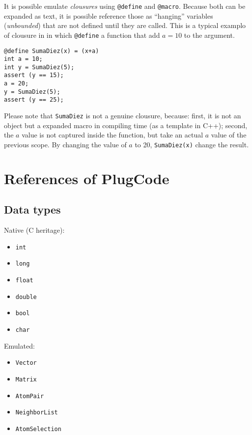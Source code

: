 \documentclass[a4paper,12pt]{article}
\begin{document}
It is possible emulate \emph{clousures} using \texttt{@define} and
\texttt{@macro}. Because both can be expanded as text, it is possible reference
those as ``hanging'' variables (\emph{unbounded}) that are not defined until
they are called. This is a typical examplo of clousure in in which
\verb'@define' a function that add $a=10$ to the argument.

\lstset{language=C}
\begin{lstlisting}
@define SumaDiez(x) = (x+a)
int a = 10;
int y = SumaDiez(5);
assert (y == 15);
a = 20;
y = SumaDiez(5);
assert (y == 25);
\end{lstlisting}

Please note that \verb'SumaDiez' is not a genuine clousure, because: first, it
is not an object but a expanded macro in compiling time (as a template in C++);
second, the $a$ value is not captured inside the function, but take an actual
$a$ value of the previous scope. By changing the value of $a$ to 20,
\verb'SumaDiez(x)' change the result.


\section{References of PlugCode}

\subsection{Data types}

Native (C heritage):

\begin{itemize}
\item \verb'int'
\item \verb'long'
\item \verb'float'
\item \verb'double'
\item \verb'bool'
\item \verb'char'
\end{itemize}

Emulated:

\begin{itemize}
\item \verb'Vector'
\item \verb'Matrix'
\item \verb'AtomPair'
\item \verb'NeighborList'
\item \verb'AtomSelection'
\end{itemize}
\end{document}
